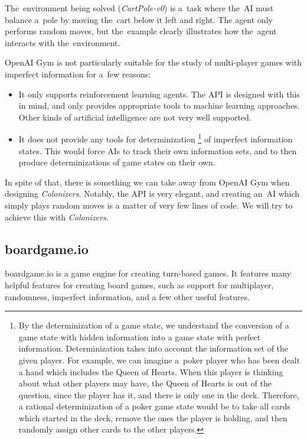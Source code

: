 The~environment being solved (\emph{CartPole-v0}) is a~task where the~AI must balance a~pole
by moving the~cart below it left and right. The agent only performs random moves,
but the~example clearly illustrates how the~agent interacts with the~environment.

OpenAI Gym is not particularly suitable for the study of multi-player games with imperfect
information for a~few reasons:
\begin{itemize}
    \item It only supports reinforcement learning agents. The API is designed with this
        in mind, and only provides appropriate tools to machine learning approaches.
        Other kinds of artificial intelligence are not very well supported.
    \item It does not provide any tools for determinization
        \footnote{By the determinization
        of a game state, we understand the conversion of a game state with hidden
        information into a game state with perfect information. Determinization
        takes into account the information set of the given player. For example, we can
        imagine a~poker player who has been dealt a hand which includes the Queen
        of Hearts. When this player is thinking about what other players may have,
        the Queen of Hearts is out of the question, since the player has it, and there
        is only one in the deck. Therefore, a rational determinization of a poker
        game state would be to take all cards which started in the deck, remove
        the ones the player is holding, and then randomly assign other cards to the
        other players.} 
        of imperfect information states. This would force AIs
        to track their own information sets, and to then produce determinizations
        of game states on their own.
\end{itemize}

In spite of that, there is something we can take away from OpenAI Gym when designing
\emph{Colonizers}. Notably, the API is very elegant, and creating an~AI which simply
plays random moves is a matter of very few lines of code. We will try to achieve
this with \emph{Colonizers}.

\subsection{boardgame.io}

boardgame.io \cite{Boardgameio} is a game engine for creating turn-based games.
It features many helpful features for creating board games, such as support for
multiplayer, randomness, imperfect information, and a few other useful features.

